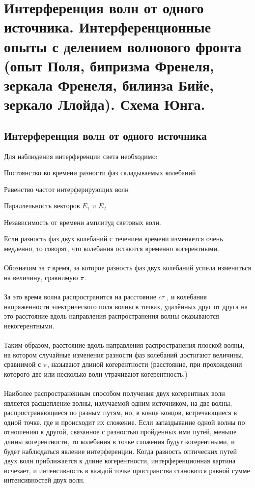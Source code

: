 \section{Интерференция волн от одного источника. Интерференционные опыты с делением волнового фронта (опыт Поля, бипризма Френеля, зеркала Френеля, билинза Бийе, зеркало Ллойда). Схема Юнга.}

\subsection{Интерференция волн от одного источника}


Для наблюдения интерференции света необходимо:
\begin{flushleft}
Постоянство во времени разности фаз складываемых колебаний


Равенство частот интерферирующих волн


Параллельность векторов \textbf{$E_1$} и \textbf{$E_2$}


Независимость от времени амплитуд световых волн.
\end{flushleft}

Если разность фаз двух колебаний с течением времени изменяется очень медленно, то говорят, что колебания остаются временно когерентными. \\ \\
Обозначим за $\tau$ время, за которое разность фаз двух колебаний успела измениться на величину, сравнимую $\pi$.\\ \\ За это время волна распространится на расстояние $c \tau$ , и колебания напряженности электрического поля волны в точках, удалённых друг от друга на это расстояние вдоль направления распространения волны оказываются некогерентными.\\ \\ Таким образом, расстояние вдоль направления распространения плоской волны, на котором случайные изменения разности фаз колебаний достигают величины, сравнимой с $\pi$, называют длиной когерентности (расстояние, при прохождении которого две или несколько волн утрачивают когерентность.)\\ \\

Наиболее распространённым способом получения двух когерентных волн является расщепление волны, излучаемой одним источником, на две волны, распространяющиеся по разным путям, но, в конце концов, встречающиеся в одной точке, где и происходит их сложение. Если запаздывание одной волны по отношению к другой, связанное с разностью пройденных ими путей, меньше длины когерентности, то колебания в точке сложения будут когерентными, и будет наблюдаться явление интерференции. Когда разность оптических путей двух волн приближается к длине когерентности, интерференционная картина исчезает, и интенсивность в каждой точке пространства становится равной сумме интенсивностей двух волн.

